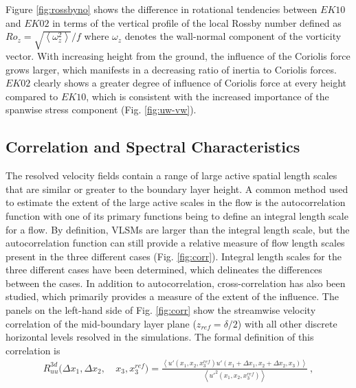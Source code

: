 Figure \ref{fig:rossbyno} shows the difference in rotational tendencies between $EK10$ and $EK02$ in terms of the vertical profile of the local Rossby number defined as $Ro_{z} = \sqrt{\left <  \omega_{z}^2\right >}/f$ where $\omega_z$ denotes the wall-normal component of the vorticity vector. With increasing height from the ground, the influence of the Coriolis force grows larger, which manifests in a decreasing ratio of inertia to Coriolis forces. $EK02$ clearly shows a greater degree of influence of Coriolis force at every height compared to $EK10$, which is consistent with the increased importance of the spanwise stress component (Fig. \ref{fig:uw-vw}). 

\subsection{Correlation and Spectral Characteristics}
The resolved velocity fields contain a  range of large active spatial length scales that are similar or greater to the boundary layer height. A common method used to estimate the extent of the large active scales in the flow is the autocorrelation function with one of its primary functions being to define an integral length scale for a flow. By definition, VLSMs are larger than the integral length scale, but the autocorrelation function can still provide a relative measure of flow length scales present in the three different cases (Fig. \ref{fig:corr}). Integral length scales for the three different cases have been determined, which delineates the differences between the cases. In addition to autocorrelation, cross-correlation has also been studied, which primarily provides a measure of the extent of the influence.  The panels on the left-hand side of Fig. \ref{fig:corr} show the streamwise velocity correlation of the mid-boundary layer plane ($z_{ref}=\delta/2$) with all other discrete horizontal levels resolved in the simulations. The formal definition of this correlation is 
\begin{align}
 R_{uu}^{3d}(\Delta x_1, \Delta x_2,\ & x_3, x_3^{ref})   =   \frac{\left < u'(x_1, x_2, x_3^{ref})u'(x_1 + \Delta x_1, x_2 + \Delta x_2, x_3) \right >}{\left < u'^{2}(x_1,x_2,x_3^{ref})\right >} \ ,
\label{eqn:3d_corr} 
\end{align}
